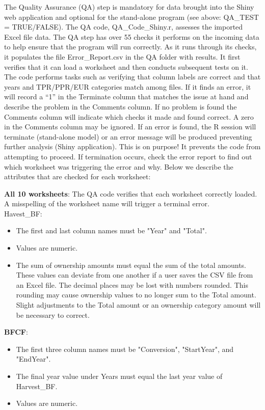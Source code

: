 \documentclass[
  openany]{book}
\providecommand{\tightlist}{%
  \setlength{\itemsep}{0pt}\setlength{\parskip}{0pt}}
\begin{document}
The Quality Assurance (QA) step is mandatory for data brought into the
Shiny web application and optional for the stand-alone program (see
above: QA\_TEST = TRUE/FALSE). The QA code, QA\_Code\_Shiny.r, assesses
the imported Excel file data. The QA step has over 55 checks it performs
on the incoming data to help ensure that the program will run correctly.
As it runs through its checks, it populates the file Error\_Report.csv
in the QA folder with results. It first verifies that it can load a
worksheet and then conducts subsequent tests on it. The code performs
tasks such as verifying that column labels are correct and that years
and TPR/PPR/EUR categories match among files. If it finds an error, it
will record a ``1'' in the Terminate column that matches the issue at
hand and describe the problem in the Comments column. If no problem is
found the Comments column will indicate which checks it made and found
correct. A zero in the Comments column may be ignored. If an error is
found, the R session will terminate (stand-alone model) or an error
message will be produced preventing further analysis (Shiny
application). This is on purpose! It prevents the code from attempting
to proceed. If termination occurs, check the error report to find out
which worksheet was triggering the error and why. Below we describe the
attributes that are checked for each worksheet:

\textbf{All 10 worksheets}: The QA code verifies that each worksheet
correctly loaded. A misspelling of the worksheet name will trigger a
terminal error.\\
Havest\_BF:

\begin{itemize}
\tightlist
\item
  The first and last column names must be "Year" and "Total".\\
\item
  Values are numeric.\\
\item
  The sum of ownership amounts must equal the sum of the total amounts.
  These values can deviate from one another if a user saves the CSV file
  from an Excel file. The decimal places may be lost with numbers
  rounded. This rounding may cause ownership values to no longer sum to
  the Total amount. Slight adjustments to the Total amount or an
  ownership category amount will be necessary to correct.
\end{itemize}

\textbf{BFCF}:

\begin{itemize}
\tightlist
\item
  The first three column names must be "Conversion", "StartYear", and
  "EndYear".\\
\item
  The final year value under Years must equal the last year value of
  Harvest\_BF.\\
\item
  Values are numeric.
\end{itemize}
\end{document}
